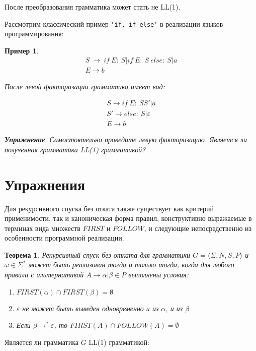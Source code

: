 \documentclass[10pt]{article}         %
\newtheorem{example}{Пример}
\newtheorem{theorem}{Теорема}
\begin{document}
	После преобразования грамматика может стать не LL(1).
	
	Рассмотрим классический пример \verb|'if, if-else'| в реализации языков программирования:
	
	\begin{example}
		\begin{align*}
			S\ \to \ if\ E:\ S | if\ E:\ S\ else:\ S | a \\
			E \to b
		\end{align*}
		
		После левой факторизации грамматика имеет вид:
		
		\begin{align*}
			S \to if\ E:\ SS' | a \\
			S' \to else:\ S | \varepsilon \\
			E \to b
		\end{align*}
		
		
		\textbf{Упражнение}. Самостоятельно проведите левую факторизацию. Является ли полученная грамматика LL(1) грамматикой?
		
	\end{example}
	\section{Упражнения}
	Для рекурсивного спуска без отката также существует как критерий применимости, так и каноническая форма правил, конструктивно выражаемые в терминах вида множеств $FIRST$ и $FOLLOW$, и следующие непосредственно из особенности программной реализации.
	
	\begin{theorem}
		Рекурсивный спуск без отката для грамматики $G = \langle \Sigma, N, S, P \rangle$ и $\omega \in \Sigma^{*}$ может быть реализован тогда и только тогда, когда для любого правила с альтернативой $A\to \alpha | \beta \in P$ выполнены условия:
		\begin{enumerate}
			\item $FIRST(\alpha)\cap{FIRST(\beta)}=\emptyset$
			\item $\varepsilon$ не может быть выведен одновременно и из $\alpha$, и из $\beta$
			\item Если $\beta \to^*\varepsilon$, то $FIRST(A)\cap{FOLLOW(A)}=\emptyset$
		\end{enumerate}
	\end{theorem}
	
	Является ли грамматика $G$ LL(1) грамматикой:
	
\end{document}
